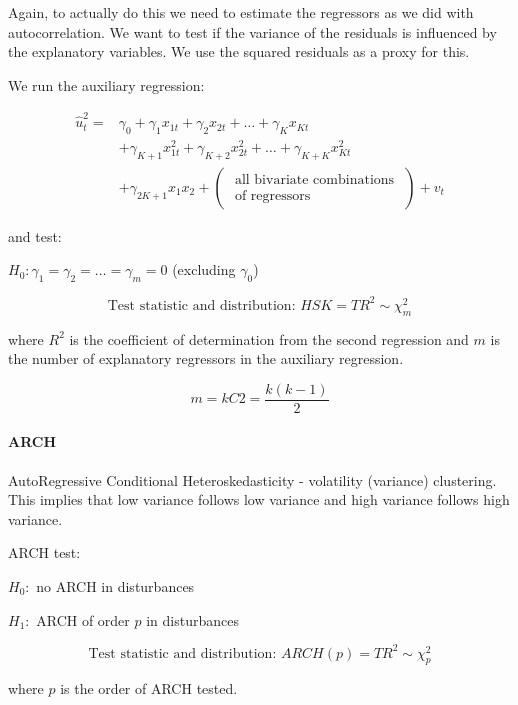 \documentclass[11pt]{article}
\begin{document}
Again, to actually do this we need to estimate the regressors as we did with autocorrelation. We want to test if the variance of the residuals is influenced by the explanatory variables. We use the squared residuals as a proxy for this.

We run the auxiliary regression:

\begin{equation}
\begin{aligned}
\hat{u}_t^2= & \gamma_0+\gamma_1 x_{1 t}+\gamma_2 x_{2 t}+\ldots+\gamma_K x_{K t} \\
& +\gamma_{K+1} x_{1 t}^2+\gamma_{K+2} x_{2 t}^2+\ldots+\gamma_{K+K} x_{K t}^2 \\
& +\gamma_{2 K+1} x_1 x_2+\left(\begin{array}{c}
\text { all bivariate combinations } \\
\text { of regressors }
\end{array}\right)+v_t
\end{aligned}
\end{equation}

and test:

$H_0: \gamma_1 = \gamma_2 = \ldots = \gamma_m = 0$ (excluding $\gamma_0$)

\[\text{Test statistic and distribution: } HSK = TR^2 \sim \chi_m^2\]

where $R^2$ is the coefficient of determination from the second regression and $m$ is the number of explanatory regressors in the auxiliary regression.

\[m = kC2 = \dfrac{k(k-1)}{2}\]

\paragraph{ARCH} \mbox{}

AutoRegressive Conditional Heteroskedasticity - volatility (variance) clustering. This implies that low variance follows low variance and high variance follows high variance.

\begin{mdframed}
    ARCH test:

    $H_0:$ no ARCH in disturbances

    $H_1:$ ARCH of order $p$ in disturbances

    \[\text{Test statistic and distribution: } ARCH(p) = TR^2 \sim \chi_p^2\]

    where $p$ is the order of ARCH tested.
\end{mdframed}
\end{document}
